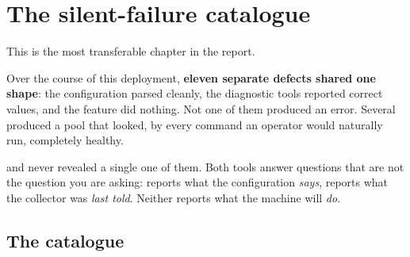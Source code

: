 \chapter{The silent-failure catalogue}
\label{ch:failure}

This is the most transferable chapter in the report.

Over the course of this deployment, \textbf{eleven separate defects shared one
shape}: the configuration parsed cleanly, the diagnostic tools reported correct
values, and the feature did nothing. Not one of them produced an error. Several
produced a pool that looked, by every command an operator would naturally run,
completely healthy.

\begin{keypoint}
 and  never revealed a single one of
them. Both tools answer questions that are not the question you are asking:
 reports what the configuration \emph{says},
 reports what the collector was \emph{last told}. Neither
reports what the machine will \emph{do}.
\end{keypoint}

\section{The catalogue}

